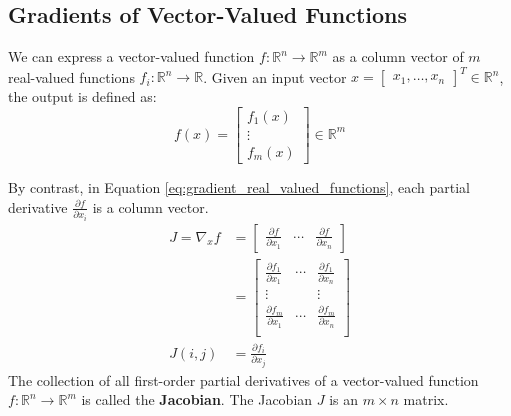 \documentclass{article}
\begin{document}
\subsection{Gradients of Vector-Valued Functions}
We can express a vector-valued function $f:\mathbb{R}^n\to \mathbb{R}^m$ as a
column vector of $m$ real-valued functions $f_i:\mathbb{R}^n\to \mathbb{R}$.
Given an input vector $x=\begin{bmatrix} x_1,\ldots,x_n \end{bmatrix}^T\in
\mathbb{R}^n$, the output is defined as: 
$$
f(x)=\begin{bmatrix} f_1(x)\\
\vdots \\ f_m(x) \end{bmatrix}\in \mathbb{R}^m
$$
\begin{definition}[Jacobian]
    By contrast, in Equation \ref{eq:gradient_real_valued_functions}, each partial
    derivative $\frac{\partial f}{\partial x_i}$ is a column vector.
    $$
    \begin{aligned}
        J=\nabla_x f&=\begin{bmatrix}
            \frac{\partial{f}}{\partial{x_1}} & \cdots &
            \frac{\partial{f}}{\partial{x_n}}
        \end{bmatrix} \\ 
                  &=\begin{bmatrix}
                      \frac{\partial{f_1}}{\partial{x_1}} & \cdots &
                      \frac{\partial{f_1}}{\partial{x_n}} \\ 
                      \vdots & & \vdots \\ 
                      \frac{\partial{f_m}}{\partial{x_1}} & \cdots &
                      \frac{\partial{f_m}}{\partial{x_n}} \\ 
                  \end{bmatrix}\\
            J(i,j)&=\frac{\partial f_i}{\partial{x_j}}
    \end{aligned}
    $$
    The collection of all first-order partial derivatives of a vector-valued
    function $f:\mathbb{R}^n\to \mathbb{R}^m$ is called the \textbf{Jacobian}.
    The Jacobian $J$ is an $m\times n$ matrix.
\end{definition}
\newpage
\end{document}
